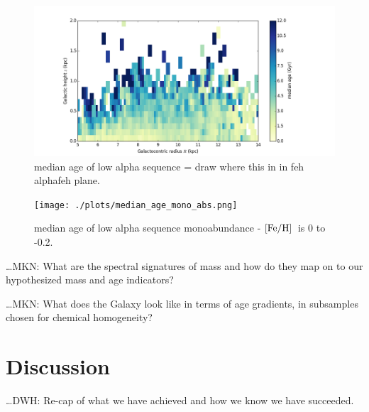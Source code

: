 \documentclass[12pt, preprint]{aastex}
\newcommand{\feh}{\mbox{$\rm [Fe/H]$}}
\begin{document}
\begin{figure}[p!]
\centering
    \includegraphics[scale=0.4]{./plots/median_age_low_alpha_abs.png}
    \caption{median age of low alpha sequence = draw where this in in feh alphafeh plane. }
\label{fig:alphabins}
\vspace{-60pt}
\end{figure}

\begin{figure}[p!]
\centering
    \texttt{[image: ./plots/median\_age\_mono\_abs.png]}
    \caption{median age of low alpha sequence monoabundance  -  \feh\ is 0 to -0.2. }
\label{fig:alphabins}
\end{figure}


\ldots MKN: What are the spectral signatures of mass and how do they
map on to our hypothesized mass and age indicators?


\ldots MKN: What does the Galaxy look like in terms of age gradients,
in subsamples chosen for chemical homogeneity?

\section{Discussion}

\ldots DWH: Re-cap of what we have achieved and how we know we have
succeeded.
\end{document}
